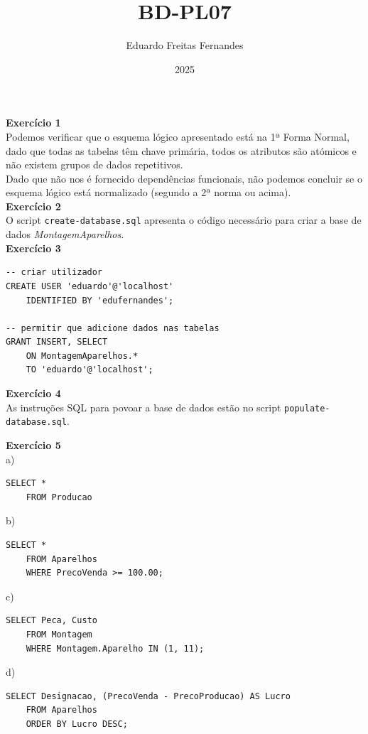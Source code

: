 \documentclass[a4paper, 11pt]{article}
\title{BD-PL07}
\author{Eduardo Freitas Fernandes}
\date{2025}
\begin{document}
\maketitle

\noindent \textbf{Exercício 1}\\

\noindent Podemos verificar que o esquema lógico apresentado está na 1ª Forma Normal, dado que todas as tabelas têm chave primária, todos os atributos são atómicos e não existem grupos de dados repetitivos.\\

\noindent Dado que não nos é fornecido dependências funcionais, não podemos concluir se o esquema lógico está normalizado (segundo a 2ª norma ou acima).\\

\noindent \textbf{Exercício 2}\\

\noindent O script \texttt{create-database.sql} apresenta o código necessário para criar a base de dados \textit{MontagemAparelhos}.\\

\noindent \textbf{Exercício 3}\\

\begin{lstlisting}[style=simpleSQL]
-- criar utilizador
CREATE USER 'eduardo'@'localhost'
    IDENTIFIED BY 'edufernandes';

-- permitir que adicione dados nas tabelas
GRANT INSERT, SELECT
    ON MontagemAparelhos.*
    TO 'eduardo'@'localhost';
\end{lstlisting}

\noindent \textbf{Exercício 4}\\

\noindent As instruções SQL para povoar a base de dados estão no script \texttt{populate-database.sql}.\\

\newpage

\noindent \textbf{Exercício 5}\\

\noindent a)
\begin{lstlisting}[style=simpleSQL]
SELECT *
    FROM Producao
\end{lstlisting}

\noindent b)
\begin{lstlisting}[style=simpleSQL]
SELECT *
    FROM Aparelhos
    WHERE PrecoVenda >= 100.00;
\end{lstlisting}

\noindent c)
\begin{lstlisting}[style=simpleSQL]
SELECT Peca, Custo
    FROM Montagem
    WHERE Montagem.Aparelho IN (1, 11);
\end{lstlisting}


\noindent d)
\begin{lstlisting}[style=simpleSQL]
SELECT Designacao, (PrecoVenda - PrecoProducao) AS Lucro
    FROM Aparelhos
    ORDER BY Lucro DESC;
\end{lstlisting}
\end{document}
